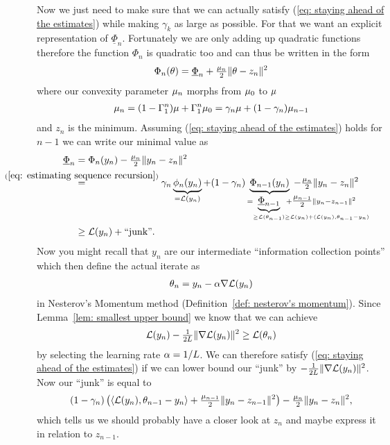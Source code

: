 Now we just need to make sure that we can actually satisfy (\ref{eq: staying
ahead of the estimates}) while making \(\gamma_k\) as large as possible.
For that we want an explicit representation of \(\underline{\Phi}_{n}\).
Fortunately we are only adding up quadratic functions therefore the function
\(\Phi_{n}\) is quadratic too and can thus be written in the form
\begin{align}\label{eq: centered Phi representation}
	\Phi_{n}(\theta) = \underline{\Phi}_{n} + \tfrac{\mu_{n}}{2}\|\theta - z_n\|^2
\end{align}
where our convexity parameter \(\mu_n\) morphs from \(\mu_0\) to
\(\mu\)
\begin{align*}
	\mu_n =(1-\Gamma_1^n)\mu + \Gamma_1^n \mu_0
	= \gamma_n \mu + (1-\gamma_n)\mu_{n-1}
\end{align*}
and \(z_n\) is the minimum. Assuming (\ref{eq: staying ahead of the estimates})
holds for \(n-1\) we can write our minimal value as
\begin{align*}
	\underline{\Phi}_n
	&= \Phi_n(y_n) - \tfrac{\lbound_n}{2}\|y_n - z_n\|^2 \\
	&\lxeq{(\ref{eq: estimating sequence recursion})}
	\gamma_n \underbrace{\phi_n(y_n)}_{
		=\Loss(y_n)
	}
	+ (1-\gamma_n)\underbrace{\Phi_{n-1}(y_n)}_{
		= \underbrace{\underline{\Phi}_{n-1}}_{
			\ge \Loss(\weights_{n-1})
			\mathrlap{\ge \Loss(y_n) + \langle \Loss(y_n), \weights_{n-1} - y_n\rangle}
		} +\mathrlap{\tfrac{\lbound_{n-1}}{2}\|y_n - z_{n-1}\|^2}
	} - \tfrac{\lbound_n}{2}\|y_n - z_n\|^2 \\
	&\ge \Loss(y_n) + \text{``junk''}.
\end{align*}
Now you might recall that \(y_n\) are our intermediate ``information
collection points'' which then define the actual iterate as
\begin{align*}
	\theta_n = y_n - \alpha \nabla\mathcal{L}(y_n)
\end{align*}
in Nesterov's Momentum method (Definition~\ref{def: nesterov's momentum}).
Since Lemma~\ref{lem: smallest upper bound} we know that we can achieve
\begin{align*}
	\mathcal{L}(y_n) - \tfrac{1}{2L}\|\nabla\mathcal{L}(y_n)\|^2
	\ge \mathcal{L}(\theta_n)
\end{align*}
by selecting the learning rate \(\alpha=1/L\). We can therefore satisfy
(\ref{eq: staying ahead of the estimates}) if we can lower bound our ``junk''
by \( - \tfrac{1}{2L}\|\nabla\mathcal{L}(y_n)\|^2\). Now our ``junk'' is equal to
\begin{align*}
	(1-\gamma_n)\left(
		\langle \mathcal{L}(y_n), \theta_{n-1} - y_n\rangle
		+ \tfrac{\mu_{n-1}}{2}\|y_n - z_{n-1}\|^2
	\right)
	- \tfrac{\mu_n}{2}\|y_n - z_n\|^2,
\end{align*}
which tells us we should probably have a closer look at \(z_n\) and maybe
express it in relation to \(z_{n-1}\).

